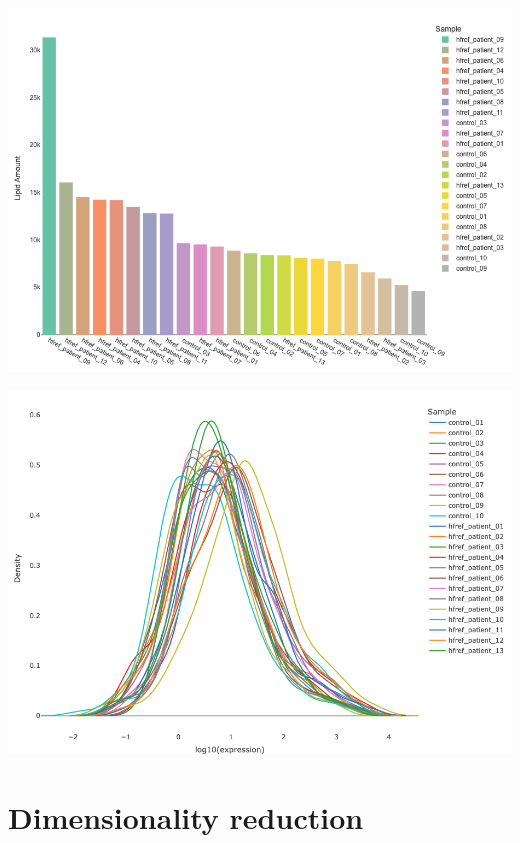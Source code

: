 \documentclass[]{article}
\newcommand{\hlcom}[1]{\textcolor[rgb]{0.502,0.502,0.502}{\textit{#1}}}%
\newcommand{\hlopt}[1]{\textcolor[rgb]{0,0,0}{#1}}%
\newcommand{\hlstd}[1]{\textcolor[rgb]{0.251,0.251,0.251}{#1}}%
\newenvironment{Shaded}{\begin{myshaded}}{\end{myshaded}}
\newcommand{\CommentTok}[1]{\hlcom{#1}}
\newcommand{\OperatorTok}[1]{\hlopt{#1}}
\newcommand{\NormalTok}[1]{\hlstd{#1}}
\begin{document}
\includegraphics{./image/exp_profilling_2.png}

\begin{Shaded}
\end{Shaded}

\includegraphics{./image/exp_profilling_3.png}

\hypertarget{DimensionReduce}{%
\section{Dimensionality reduction}\label{DimensionReduce}}
\end{document}
